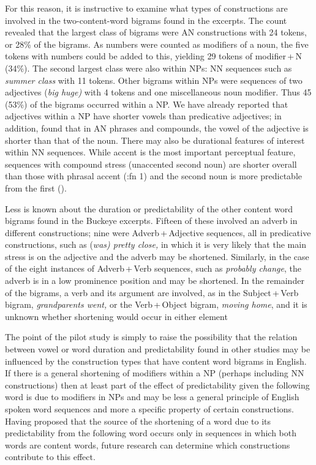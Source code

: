 \documentclass[output=paper]{langscibook}
\begin{document}
For this reason, it is instructive to examine what types of constructions are involved in the two-content-word bigrams found in the excerpts. The count revealed that the largest class of bigrams were AN constructions with 24 tokens, or 28\% of the bigrams. As numbers were counted as modifiers of a noun, the five tokens with numbers could be added to this, yielding 29 tokens of modifier\,+\,N (34\%). The second largest class were also within NPs: NN sequences such as \textit{summer class} with 11 tokens. Other bigrams within NPs were sequences of two adjectives (\textit{big huge)} with 4 tokens and one miscellaneous noun modifier. Thus 45 (53\%) of the bigrams occurred within a NP. We have already reported that adjectives within a NP have shorter vowels than predicative adjectives; in addition, \citealt{Morrill2011} found that in AN phrases and compounds, the vowel of the adjective is shorter than that of the noun. There may also be durational features of interest within NN sequences. While accent is the most important perceptual feature, sequences with compound stress (unaccented second noun) are shorter overall than those with phrasal accent (\citealt{Hirst1983}:fn 1) and the second noun is more predictable from the first (\citealt{BellPlag2012}). 

Less is known about the duration or predictability of the other content word bigrams found in the Buckeye excerpts. Fifteen of these involved an adverb in different constructions; nine were Adverb\,+\,Adjective sequences, all in predicative constructions, such as (\textit{was) pretty close,} in which it is very likely that the main stress is on the adjective and the adverb may be shortened. Similarly, in the case of the eight instances of Adverb\,+\,Verb sequences, such as \textit{probably change}, the adverb is in a low prominence position and may be shortened. In the remainder of the bigrams, a verb and its argument are involved, as in the Subject\,+\,Verb bigram, \textit{grandparents went,} or the Verb\,+\,Object bigram, \textit{moving home}, and it is unknown whether shortening would occur in either element

The point of the pilot study is simply to raise the possibility that the relation between vowel or word duration and predictability found in other studies may be influenced by the construction types that have content word bigrams in English. If there is a general shortening of modifiers within a NP (perhaps including NN constructions) then at least part of the effect of predictability given the following word is due to modifiers in NPs and may be less a general principle of English spoken word sequences and more a specific property of certain constructions. Having proposed that the source of the shortening of a word due to its predictability from the following word occurs only in sequences in which both words are content words, future research can determine which constructions contribute to this effect. 
\end{document}
